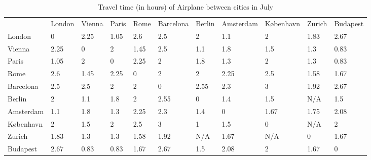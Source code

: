 \documentclass{article} %
\begin{document}
\begin{table}[!ht]
  \centering
  \begin{tabular}{lllllllllll}

     & London & Vienna & Paris & Rome & Barcelona & Berlin & Amsterdam & København & Zurich & Budapest \\

  London & 0 & 2.25 & 1.05 & 2.6 & 2.5 & 2 & 1.1 & 2 & 1.83 & 2.67 \\

  Vienna & 2.25 & 0 & 2 & 1.45 & 2.5 & 1.1 & 1.8 & 1.5 & 1.3 & 0.83 \\

  Paris & 1.05 & 2 & 0 & 2.25 & 2 & 1.8 & 1.3 & 2 & 1.3 & 0.83 \\

  Rome & 2.6 & 1.45 & 2.25 & 0 & 2 & 2 & 2.25 & 2.5 & 1.58 & 1.67 \\

  Barcelona & 2.5 & 2.5 & 2 & 2 & 0 & 2.55 & 2.3 & 3 & 1.92 & 2.67 \\

  Berlin & 2 & 1.1 & 1.8 & 2 & 2.55 & 0 & 1.4 & 1.5 & N/A & 1.5 \\

  Amsterdam & 1.1 & 1.8 & 1.3 & 2.25 & 2.3 & 1.4 & 0 & 1.67 & 1.75 & 2.08 \\

  København & 2 & 1.5 & 2 & 2.5 & 3 & 1 & 1.5 & 0 & N/A & 2 \\

  Zurich & 1.83 & 1.3 & 1.3 & 1.58 & 1.92 & N/A & 1.67 & N/A & 0 & 1.67 \\

  Budapest & 2.67 & 0.83 & 0.83 & 1.67 & 2.67 & 1.5 & 2.08 & 2 & 1.67 & 0 \\
  \end{tabular}
  \caption{Travel time (in hours) of Airplane between cities in July}%
  \label{tab:timeairplane}
\end{table}
\end{document}
